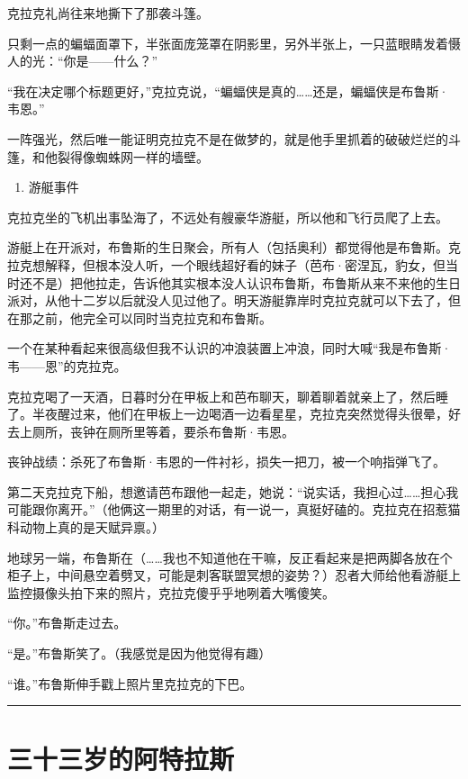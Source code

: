 \documentclass[../main]{subfiles}
\begin{document}
克拉克礼尚往来地撕下了那袭斗篷。

只剩一点的蝙蝠面罩下，半张面庞笼罩在阴影里，另外半张上，一只蓝眼睛发着慑人的光：“你是——什么？”

“我在决定哪个标题更好，”克拉克说，“蝙蝠侠是真的……还是，蝙蝠侠是布鲁斯·韦恩。”

一阵强光，然后唯一能证明克拉克不是在做梦的，就是他手里抓着的破破烂烂的斗篷，和他裂得像蜘蛛网一样的墙壁。

\begin{enumerate}
    \def\labelenumi{\arabic{enumi}.}
    \setcounter{enumi}{1}
    \item
          游艇事件
\end{enumerate}

克拉克坐的飞机出事坠海了，不远处有艘豪华游艇，所以他和飞行员爬了上去。

游艇上在开派对，布鲁斯的生日聚会，所有人（包括奥利）都觉得他是布鲁斯。克拉克想解释，但根本没人听，一个眼线超好看的妹子（芭布·密涅瓦，豹女，但当时还不是）把他拉走，告诉他其实根本没人认识布鲁斯，布鲁斯从来不来他的生日派对，从他十二岁以后就没人见过他了。明天游艇靠岸时克拉克就可以下去了，但在那之前，他完全可以同时当克拉克和布鲁斯。

一个在某种看起来很高级但我不认识的冲浪装置上冲浪，同时大喊“我是布鲁斯·韦——恩”的克拉克。

克拉克喝了一天酒，日暮时分在甲板上和芭布聊天，聊着聊着就亲上了，然后睡了。半夜醒过来，他们在甲板上一边喝酒一边看星星，克拉克突然觉得头很晕，好去上厕所，丧钟在厕所里等着，要杀布鲁斯·韦恩。

丧钟战绩：杀死了布鲁斯·韦恩的一件衬衫，损失一把刀，被一个响指弹飞了。

第二天克拉克下船，想邀请芭布跟他一起走，她说：“说实话，我担心过……担心我可能跟你离开。”（他俩这一期里的对话，有一说一，真挺好磕的。克拉克在招惹猫科动物上真的是天赋异禀。）

地球另一端，布鲁斯在（……我也不知道他在干嘛，反正看起来是把两脚各放在个柜子上，中间悬空着劈叉，可能是刺客联盟冥想的姿势？）忍者大师给他看游艇上监控摄像头拍下来的照片，克拉克傻乎乎地咧着大嘴傻笑。

“你。”布鲁斯走过去。

“是。”布鲁斯笑了。（我感觉是因为他觉得有趣）

“谁。”布鲁斯伸手戳上照片里克拉克的下巴。

\begin{center}\rule{0.5\linewidth}{0.5pt}\end{center}

\section{三十三岁的阿特拉斯}
\end{document}
